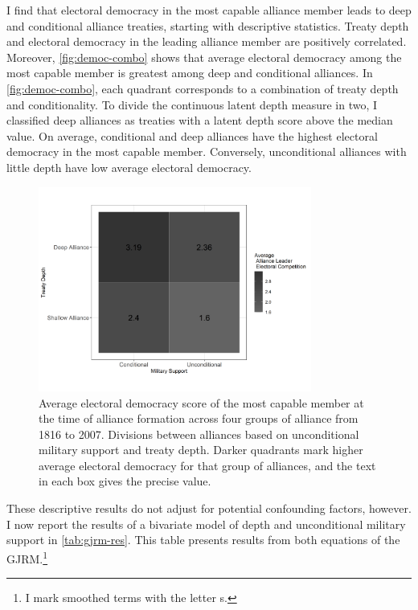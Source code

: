 \documentclass[12pt]{article}
\begin{document}
I find that electoral democracy in the most capable alliance member leads to deep and conditional alliance treaties, starting with descriptive statistics. 
Treaty depth and electoral democracy in the leading alliance member are positively correlated. 
Moreover, \autoref{fig:democ-combo} shows that average electoral democracy among the most capable member is greatest among deep and conditional alliances. 	
In \autoref{fig:democ-combo}, each quadrant corresponds to a combination of treaty depth and conditionality. 
To divide the continuous latent depth measure in two, I classified deep alliances as treaties with a latent depth score above the median value. 
On average, conditional and deep alliances have the highest electoral democracy in the most capable member. 
Conversely, unconditional alliances with little depth have low average electoral democracy.


\begin{figure}[hbtp]
\centering
\includegraphics[width=0.8\textwidth]{../figures/democ-combo.png}
\caption{Average electoral democracy score of the most capable member at the time of alliance formation across four groups of alliance from 1816 to 2007. Divisions between alliances based on unconditional military support and treaty depth. Darker quadrants mark higher average electoral democracy for that group of alliances, and the text in each box gives the precise value.}
\label{fig:democ-combo}
\end{figure}


These descriptive results do not adjust for potential confounding factors, however.
I now report the results of a bivariate model of depth and unconditional military support in \autoref{tab:gjrm-res}. 
This table presents results from both equations of the GJRM.\footnote{I mark smoothed terms with the letter s.} 
\end{document}
